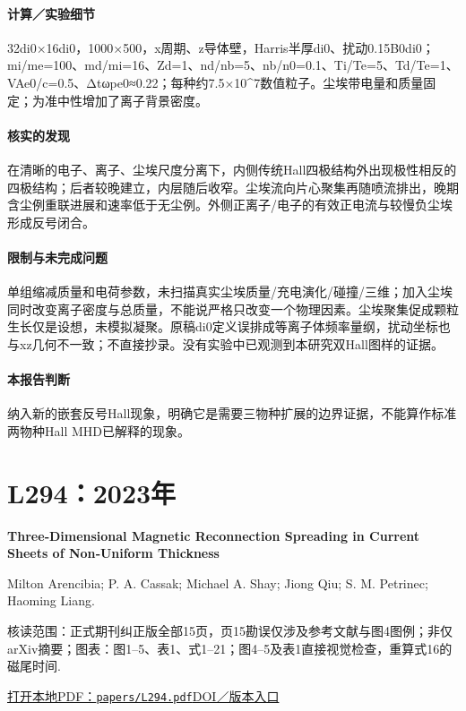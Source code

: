 \paragraph{计算／实验细节}32di0×16di0，1000×500，x周期、z导体壁，Harris半厚di0、扰动0.15B0di0；mi/me=100、md/mi=16、Zd=1、nd/nb=5、nb/n0=0.1、Ti/Te=5、Td/Te=1、VAe0/c=0.5、Δtωpe0≈0.22；每种约7.5×10\textasciicircum{}7数值粒子。尘埃带电量和质量固定；为准中性增加了离子背景密度。

\paragraph{核实的发现}在清晰的电子、离子、尘埃尺度分离下，内侧传统Hall四极结构外出现极性相反的四极结构；后者较晚建立，内层随后收窄。尘埃流向片心聚集再随喷流排出，晚期含尘例重联进展和速率低于无尘例。外侧正离子/电子的有效正电流与较慢负尘埃形成反号闭合。

\paragraph{限制与未完成问题}单组缩减质量和电荷参数，未扫描真实尘埃质量/充电演化/碰撞/三维；加入尘埃同时改变离子密度与总质量，不能说严格只改变一个物理因素。尘埃聚集促成颗粒生长仅是设想，未模拟凝聚。原稿di0定义误排成等离子体频率量纲，扰动坐标也与xz几何不一致；不直接抄录。没有实验中已观测到本研究双Hall图样的证据。

\paragraph{本报告判断}纳入新的嵌套反号Hall现象，明确它是需要三物种扩展的边界证据，不能算作标准两物种Hall MHD已解释的现象。

\section{L294：2023年}\label{paper:L294}

\textbf{Three‐Dimensional Magnetic Reconnection Spreading in Current Sheets of Non‐Uniform Thickness}\citep{L294}\

Milton Arencibia;  P. A. Cassak;  Michael A. Shay;  Jiong Qiu;  S. M. Petrinec;  Haoming Liang.

\textsf{核读范围：}正式期刊纠正版全部15页，页15勘误仅涉及参考文献与图4图例；非仅arXiv摘要；\textsf{图表：}图1–5、表1、式1–21；图4–5及表1直接视觉检查，重算式16的磁尾时间.

\href{run:papers/L294.pdf}{打开本地PDF：\texttt{papers/L294.pdf}}\quad\href{https://doi.org/10.1029/2022ja030999}{DOI／版本入口}

